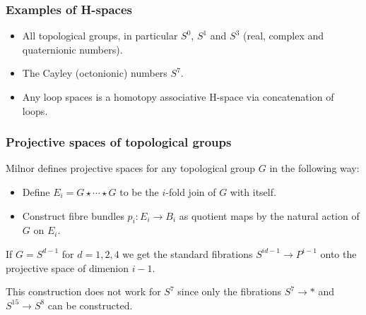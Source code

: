 \documentclass{beamer}
\theoremstyle{definition}
\begin{document}
\begin{frame}
\frametitle{Examples of H-spaces}
\begin{itemize}
\item<1-> All topological groups, in particular $S^0$, $S^1$ and $S^3$ (real, complex and quaternionic numbers).
\item<2-> The Cayley (octonionic) numbers $S^7$.
\item<3-> Any loop spaces is a homotopy associative H-space via concatenation of loops.
\end{itemize}
	
\end{frame}

\begin{frame}
\frametitle{Projective spaces of topological groups}
Milnor defines projective spaces for any topological group $G$ in the following way:\pause
\begin{itemize}
\item<2-> Define $E_i=G\star\cdots\star G$ to be the $i$-fold join of $G$ with itself.
\item<2-> Construct fibre bundles $p_i:E_i\to B_i$ as quotient maps by the natural action of $G$ on $E_i$.
\end{itemize}\pause

If $G=S^{d-1}$ for $d=1,2,4$ we get the standard fibrations $S^{id-1}\to P^{i-1}$ onto the projective space of dimenion $i-1$.\pause

This construction does not work for $S^7$ since only the fibrations $S^7\to *$ and $S^{15}\to S^8$ can be constructed.
\end{frame}
\end{document}
